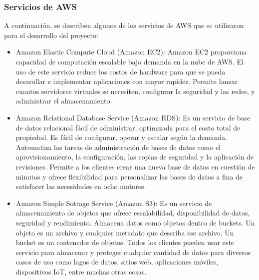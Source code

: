 \subsubsection{Servicios de AWS}
A continuación, se describen algunos de los servicios de AWS que se utilizaron para el desarrollo del proyecto:
    \begin{itemize}
        \item Amazon Elastic Compute Cloud (Amazon EC2): Amazon EC2 proporciona capacidad de computación escalable bajo demanda en la nube de AWS. El uso de este servicio reduce los costos de hardware para que se pueda desarollar e implementar aplicaciones con mayor rapidez. Permite lanzar cuantos servidores virtuales se necesiten, configurar la seguridad y las redes, y administrar el almacenamiento.
        \item Amazon Relational Database Service (Amazon RDS): Es un servicio de base de datos relacional fácil de administrar, optimizada para el costo total de propiedad. Es fácil de configurar, operar y escalar según la demanda. Automatiza las tareas de administración de bases de datos como el aprovisionamiento, la configuración, las copias de seguridad y la aplicación de revisiones. Permite a los clientes crear una nueva base de datos en cuestión de minutos y ofrece flexibilidad para personalizar las bases de datos a fina de satisfacer las necesidades en ocho motores.
        \item Amazon Simple Sotrage Service (Amazon S3): Es un servicio de almacenamiento de objetos que ofrece escalabilidad, disponibilidad de datos, seguridad y rendimiento. Almacena datos como objetos dentro de buckets. Un objeto es un archivo y cualquier metadato que describa ese archivo. Un bucket es un contenedor de objetos. Todos los clientes pueden usar este servicio para almacenar y proteger cualquier cantidad de datos para diversos casos de uso como lagos de datos, sitios web, aplicaciones móviles, dispositivos IoT, entre muchas otras cosas. 
    \end{itemize}